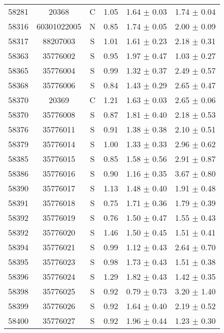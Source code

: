 \begin{longtable*}[c]{cccccc}
    58281 & 20368 & C     & 1.05  & 1.64  $\pm$ 0.03  & 1.74  $\pm$ 0.04 \\
    58316 & 60301022005 & N     & 0.85  & 1.74  $\pm$ 0.05  & 2.00  $\pm$ 0.09 \\
    58317 & 88207003 & S     & 1.01  & 1.61  $\pm$ 0.23  & 2.18  $\pm$ 0.31 \\
    58363 & 35776002 & S     & 0.95  & 1.97  $\pm$ 0.47  & 1.03  $\pm$ 0.27 \\
    58365 & 35776004 & S     & 0.99  & 1.32  $\pm$ 0.37  & 2.49  $\pm$ 0.57 \\
    58368 & 35776006 & S     & 0.84  & 1.43  $\pm$ 0.29  & 2.65  $\pm$ 0.47 \\
    58370 & 20369 & C     & 1.21  & 1.63  $\pm$ 0.03  & 2.65  $\pm$ 0.06 \\
    58370 & 35776008 & S     & 0.87  & 1.81  $\pm$ 0.40  & 2.18  $\pm$ 0.53 \\
    58376 & 35776011 & S     & 0.91  & 1.38  $\pm$ 0.38  & 2.10  $\pm$ 0.51 \\
    58379 & 35776014 & S     & 1.00  & 1.33  $\pm$ 0.33  & 2.96  $\pm$ 0.62 \\
    58385 & 35776015 & S     & 0.85  & 1.58  $\pm$ 0.56  & 2.91  $\pm$ 0.87 \\
    58386 & 35776016 & S     & 0.90  & 1.16  $\pm$ 0.35  & 3.67  $\pm$ 0.80 \\
    58390 & 35776017 & S     & 1.13  & 1.48  $\pm$ 0.40  & 1.91  $\pm$ 0.48 \\
    58391 & 35776018 & S     & 0.75  & 1.71  $\pm$ 0.36  & 1.79  $\pm$ 0.39 \\
    58392 & 35776019 & S     & 0.76  & 1.50  $\pm$ 0.47  & 1.55  $\pm$ 0.43 \\
    58392 & 35776020 & S     & 1.46  & 1.50  $\pm$ 0.45  & 1.51  $\pm$ 0.41 \\
    58394 & 35776021 & S     & 0.99  & 1.12  $\pm$ 0.43  & 2.64  $\pm$ 0.70 \\
    58395 & 35776023 & S     & 0.98  & 1.73  $\pm$ 0.43  & 1.51  $\pm$ 0.38 \\
    58396 & 35776024 & S     & 1.29  & 1.82  $\pm$ 0.43  & 1.42  $\pm$ 0.35 \\
    58398 & 35776025 & S     & 0.92  & 0.79  $\pm$ 0.73  & 3.20  $\pm$ 1.40 \\
    58399 & 35776026 & S     & 0.92  & 1.64  $\pm$ 0.40  & 2.19  $\pm$ 0.52 \\
    58400 & 35776027 & S     & 0.92  & 1.96  $\pm$ 0.44  & 1.23  $\pm$ 0.30 \\

\end{longtable*}
